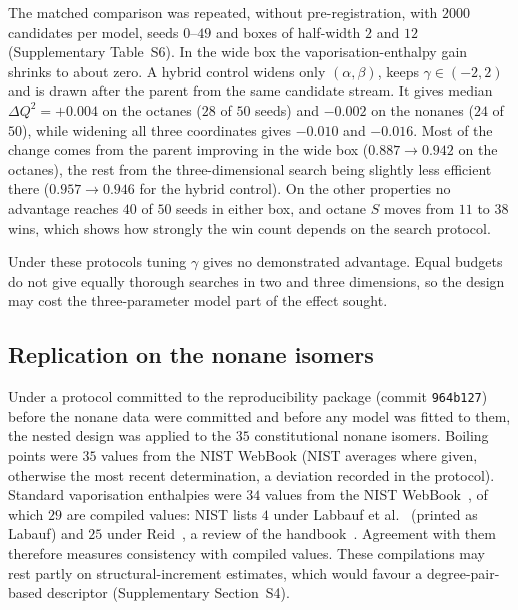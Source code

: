 \documentclass[a5paper, 10pt]{article}
\theoremstyle{plain}
\theoremstyle{remark}
\theoremstyle{definition}
\begin{document}
The matched comparison was repeated, without pre-registration, with
$2000$ candidates per model, seeds $0$--$49$ and boxes of half-width $2$
and $12$ (Supplementary Table~S6). In the wide box the
vaporisation-enthalpy gain shrinks to about zero. A hybrid control
widens only $(\alpha,\beta)$, keeps $\gamma \in (-2,2)$ and is drawn
after the parent from the same candidate stream. It gives median
$\Delta Q^2 = +0.004$ on the octanes ($28$ of $50$ seeds) and $-0.002$
on the nonanes ($24$ of $50$), while widening all three coordinates
gives $-0.010$ and $-0.016$. Most of the change comes from the parent
improving in the wide box ($0.887 \to 0.942$ on the octanes), the rest
from the three-dimensional search being slightly less efficient there
($0.957 \to 0.946$ for the hybrid control). On the other properties no
advantage reaches $40$ of $50$ seeds in either box, and octane $S$ moves from $11$ to $38$ wins, which shows how strongly the win count depends on the search protocol.

Under these protocols tuning $\gamma$ gives no
demonstrated advantage. Equal budgets do not give equally thorough
searches in two and three dimensions, so the design may cost the
three-parameter model part of the effect sought.

\subsection{Replication on the nonane isomers}\label{sec:external}

Under a protocol committed to the reproducibility package (commit
\texttt{964b127}) before the nonane data were committed and before any
model was fitted to them, the nested
design was applied to the $35$ constitutional nonane isomers. Boiling
points were $35$ values from the NIST WebBook (NIST averages where
given, otherwise the most recent determination, a deviation recorded in
the protocol). Standard vaporisation enthalpies were $34$ values from
the NIST WebBook~\cite{NISTWebBook}, of which $29$ are compiled values: NIST lists $4$ under Labbauf et al.~\cite{LabaufGreenshieldsRossini1961} (printed as Labauf) and $25$ under Reid~\cite{Reid1972}, a review of the handbook~\cite{WilhoitZwolinski1971}. Agreement with
them therefore measures consistency with compiled values. These
compilations may rest partly on structural-increment estimates, which
would favour a degree-pair-based descriptor (Supplementary
Section~S4).
\end{document}
